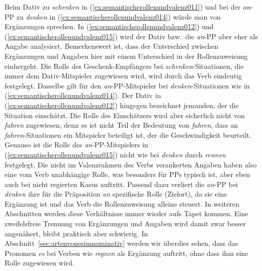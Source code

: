 \begin{exe}
  \ex\label{ex:semantischerollenundvalenz010}
  \begin{xlist}
  \end{xlist}
  \ex\label{ex:semantischerollenundvalenz013}
  \begin{xlist}
  \end{xlist}
\end{exe}

Beim Dativ zu \textit{schenken} in (\ref{ex:semantischerollenundvalenz011}) und bei der \textit{an}-PP zu \textit{denken} in (\ref{ex:semantischerollenundvalenz014}) würde man von Ergänzungen sprechen.
In (\ref{ex:semantischerollenundvalenz012}) und (\ref{ex:semantischerollenundvalenz015}) wird der Dativ bzw.\ die \textit{an}-PP aber eher als Angabe analysiert.
Bemerkenswert ist, dass der Unterschied zwischen Ergänzungen und Angaben hier mit einem Unterschied in der Rollenzuweisung einhergeht.
Die Rolle des Geschenk-Empfängers bei \textit{schenken}-Situationen, die immer dem Dativ-Mitspieler zugewiesen wird, wird durch das Verb eindeutig festgelegt.
Dasselbe gilt für den \textit{an}-PP-Mitspieler bei \textit{denken}-Situationen wie in (\ref{ex:semantischerollenundvalenz014}).
Der Dativ in (\ref{ex:semantischerollenundvalenz012}) hingegen bezeichnet jemanden, der die Situation einschätzt.
Die Rolle des Einschätzers wird aber sicherlich nicht von \textit{fahren} zugewiesen, denn es ist nicht Teil der Bedeutung von \textit{fahren}, dass an \textit{fahren}-Situationen ein Mitspieler beteiligt ist, der die Geschwindigkeit beurteilt.
Genauso ist die Rolle des \textit{an}-PP-Mitspielers in (\ref{ex:semantischerollenundvalenz015}) nicht wie bei \textit{denken} durch \textit{rennen} festgelegt.
Die nicht im Valenzrahmen des Verbs verankerten Angaben haben also eine vom Verb unabhängige Rolle, was besonders für PPs typisch ist, aber eben auch bei nicht regierten Kasus auftritt.
Passend dazu verliert die \textit{an}-PP bei \textit{denken} ihre für die Präposition \textit{an} spezifische Rolle (Zielort), da sie eine Ergänzung ist und das Verb die Rollenzuweisung alleine steuert.
In weiteren Abschnitten werden diese Verhältnisse immer wieder aufs Tapet kommen.
Eine zweifelsfreie Trennung von Ergänzungen und Angaben wird damit zwar besser angenähert, bleibt praktisch aber schwierig.
In Abschnitt~\ref{sec:artenvonesimnominativ} werden wir überdies sehen, dass das Pronomen \textit{es} bei Verben wie \textit{regnen} als Ergänzung auftritt, ohne dass ihm eine Rolle zugewiesen wird.

